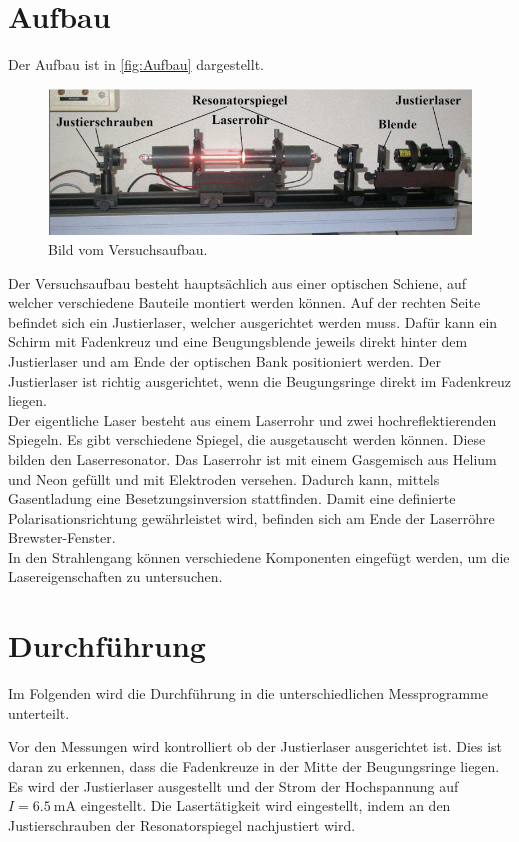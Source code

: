 \section{Aufbau}
\label{sec:Aufbau}
Der Aufbau ist in \autoref{fig:Aufbau} dargestellt.
\begin{figure}[H]
    \centering
    \includegraphics[scale=0.7]{Abbildungen/Aufbau.png}
    \caption{Bild vom Versuchsaufbau.\cite{V61}}
    \label{fig:Aufbau}
\end{figure}
Der Versuchsaufbau besteht hauptsächlich aus einer optischen Schiene, auf welcher verschiedene Bauteile montiert werden können.
Auf der rechten Seite befindet sich ein Justierlaser, welcher ausgerichtet werden muss. Dafür kann ein Schirm mit Fadenkreuz und eine Beugungsblende
jeweils direkt hinter dem Justierlaser und am Ende der optischen Bank positioniert werden. Der Justierlaser ist richtig ausgerichtet, wenn die 
Beugungsringe direkt im Fadenkreuz liegen.\\
Der eigentliche Laser besteht aus einem Laserrohr und zwei hochreflektierenden Spiegeln.
Es gibt verschiedene Spiegel, die ausgetauscht werden können. Diese bilden den Laserresonator.
Das Laserrohr ist mit einem Gasgemisch aus Helium und Neon gefüllt und mit Elektroden versehen. Dadurch kann, mittels Gasentladung eine Besetzungsinversion stattfinden.
Damit eine definierte Polarisationsrichtung gewährleistet wird, befinden sich am Ende der Laserröhre Brewster-Fenster.\\
In den Strahlengang können verschiedene Komponenten eingefügt werden, um die Lasereigenschaften zu untersuchen.

\section{Durchführung}
\label{sec:Durchführung}
Im Folgenden wird die Durchführung in die unterschiedlichen Messprogramme unterteilt.

Vor den Messungen wird kontrolliert ob der Justierlaser ausgerichtet ist. Dies ist daran zu erkennen, dass die Fadenkreuze in der Mitte der Beugungsringe
liegen.
Es wird der Justierlaser ausgestellt und der Strom der Hochspannung
auf $I = \qty{6.5}{\milli\A}$ eingestellt. Die Lasertätigkeit wird eingestellt, indem an den Justierschrauben der Resonatorspiegel
nachjustiert wird.


